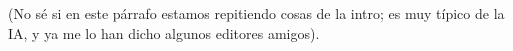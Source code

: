 \documentclass[a4paper,11pt,oneside]{article}
\begin{document}
{\color{red} (No sé si en este párrafo estamos repitiendo cosas de la intro; es muy típico de la IA, y ya me lo han dicho algunos editores amigos).}




\end{document}
